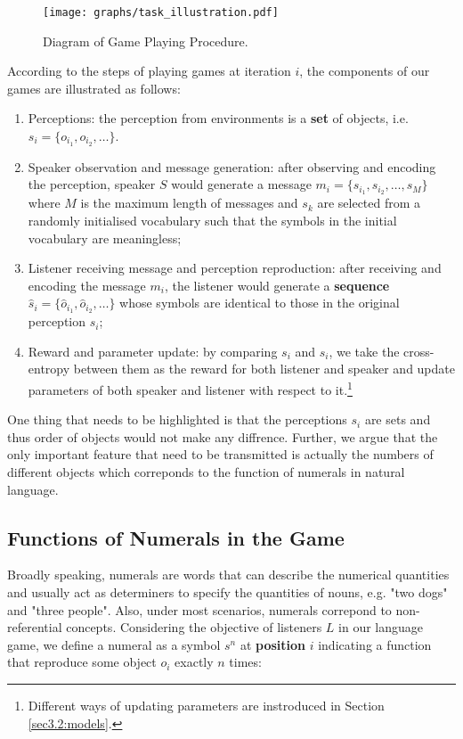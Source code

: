 \begin{figure}[!h]
  \centering
  \texttt{[image: graphs/task\_illustration.pdf]}
  \caption{Diagram of Game Playing Procedure.}
  \label{fig2:game_procedure}
\end{figure}

According to the steps of playing games at iteration $i$, the components of our games are illustrated as follows:
\begin{enumerate}
  \item Perceptions: the perception from environments is a \textbf{set} of objects, i.e. $s_i=\{o_{i_1}, o_{i_2}, \dots\}$.
  \item Speaker observation and message generation: after observing and encoding the perception, speaker $S$ would generate a message $m_i=\{s_{i_1}, s_{i_2}, \dots, s_{M}\}$ where $M$ is the maximum length of messages and $s_k$ are selected from a randomly initialised vocabulary such that the symbols in the initial vocabulary are meaningless;
  \item Listener receiving message and perception reproduction: after receiving and encoding the message $m_i$, the listener would generate a \textbf{sequence} $\hat{s}_i = \{\hat{o}_{i_1}, \hat{o}_{i_2}, \dots\}$ whose symbols are identical to those in the original perception $s_i$;
  \item Reward and parameter update: by comparing $s_i$ and $\hat{s}_i$, we take the cross-entropy between them as the reward for both listener and speaker and update parameters of both speaker and listener with respect to it.\footnote{Different ways of updating parameters are instroduced in Section \ref{sec3.2:models}.}
\end{enumerate}

One thing that needs to be highlighted is that the perceptions $s_i$ are sets and thus order of objects would not make any diffrence. Further, we argue that the only important feature that need to be transmitted is actually the numbers of different objects which correponds to the function of numerals in natural language.

\subsection{Functions of Numerals in the Game}
\label{ssec3.1.2:numeral_in_game}

Broadly speaking, numerals are words that can describe the numerical quantities and usually act as determiners to specify the quantities of nouns, e.g. "two dogs" and "three people". Also, under most scenarios, numerals correpond to non-referential concepts\cite{da2016wow}. Considering the objective of listeners $L$ in our language game, we define a numeral as a symbol $s^n$ at \textbf{position} $i$ indicating a function that reproduce some object $o_i$ exactly $n$ times:

